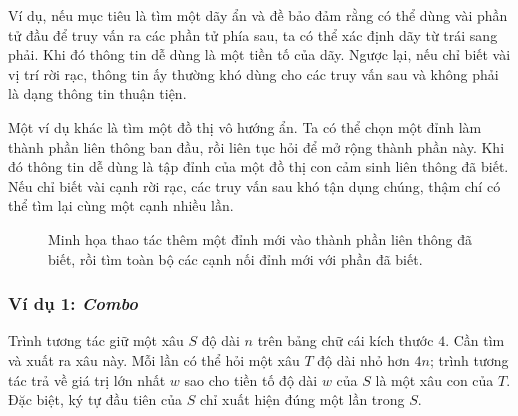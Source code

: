 \documentclass[11pt]{article}
\begin{document}
Ví dụ, nếu mục tiêu là tìm một dãy ẩn và đề bảo đảm rằng có thể dùng vài phần
tử đầu để truy vấn ra các phần tử phía sau, ta có thể xác định dãy từ trái sang
phải. Khi đó thông tin dễ dùng là một tiền tố của dãy. Ngược lại, nếu chỉ biết
vài vị trí rời rạc, thông tin ấy thường khó dùng cho các truy vấn sau và không
phải là dạng thông tin thuận tiện.

Một ví dụ khác là tìm một đồ thị vô hướng ẩn. Ta có thể chọn một đỉnh làm thành
phần liên thông ban đầu, rồi liên tục hỏi để mở rộng thành phần này. Khi đó
thông tin dễ dùng là tập đỉnh của một đồ thị con cảm sinh liên thông đã biết.
Nếu chỉ biết vài cạnh rời rạc, các truy vấn sau khó tận dụng chúng, thậm chí có
thể tìm lại cùng một cạnh nhiều lần.

\begin{figure}[htbp]
\centering
{}
\caption{Minh họa thao tác thêm một đỉnh mới vào thành phần liên thông đã biết,
rồi tìm toàn bộ các cạnh nối đỉnh mới với phần đã biết.}
\end{figure}

\subsubsection{Ví dụ 1: \emph{Combo}}

Trình tương tác giữ một xâu $S$ độ dài $n$ trên bảng chữ cái kích thước $4$.
Cần tìm và xuất ra xâu này. Mỗi lần có thể hỏi một xâu $T$ độ dài nhỏ hơn
$4n$; trình tương tác trả về giá trị lớn nhất $w$ sao cho tiền tố độ dài $w$ của
$S$ là một xâu con của $T$. Đặc biệt, ký tự đầu tiên của $S$ chỉ xuất hiện đúng
một lần trong $S$.
\end{document}
